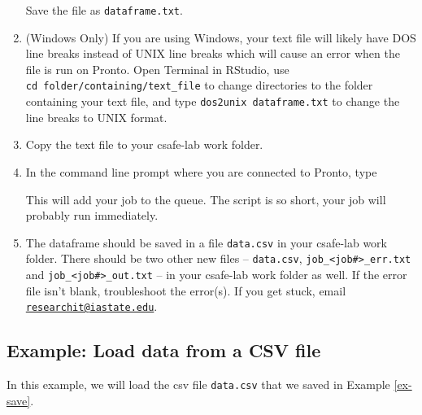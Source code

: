 \documentclass[
]{book}
\newenvironment{Shaded}{\begin{snugshade}}{\end{snugshade}}
\newcommand{\ExtensionTok}[1]{#1}
\newcommand{\NormalTok}[1]{#1}
\begin{document}
\begin{enumerate}
  Save the file as \texttt{dataframe.txt}.
\item
  (Windows Only) If you are using Windows, your text file will likely have DOS line breaks instead of UNIX line breaks which will cause an error when the file is run on Pronto. Open Terminal in RStudio, use \texttt{cd\ folder/containing/text\_file} to change directories to the folder containing your text file, and type \texttt{dos2unix\ dataframe.txt} to change the line breaks to UNIX format.
\item
  Copy the text file to your csafe-lab work folder.
\item
  In the command line prompt where you are connected to Pronto, type

\begin{Shaded}
\end{Shaded}

  This will add your job to the queue. The script is so short, your job will probably run immediately.
\item
  The dataframe should be saved in a file \texttt{data.csv} in your csafe-lab work folder. There should be two other new files -- \texttt{data.csv}, \texttt{job\_\textless{}job\#\textgreater{}\_err.txt} and \texttt{job\_\textless{}job\#\textgreater{}\_out.txt} -- in your csafe-lab work folder as well. If the error file isn't blank, troubleshoot the error(s). If you get stuck, email \href{mailto:researchit@iastate.edu}{\nolinkurl{researchit@iastate.edu}}.
\end{enumerate}

\hypertarget{ex-load}{%
\subsection{Example: Load data from a CSV file}\label{ex-load}}

In this example, we will load the csv file \texttt{data.csv} that we saved in Example \ref{ex-save}.
\end{document}
